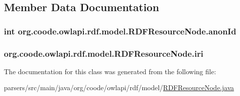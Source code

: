 \subsection{Member Data Documentation}
\hypertarget{classorg_1_1coode_1_1owlapi_1_1rdf_1_1model_1_1_r_d_f_resource_node_abaac8c51697586287ab04b15fec1da51}{
\subsubsection[{anon\-Id}]{\setlength{\rightskip}{0pt plus 5cm}int org.\-coode.\-owlapi.\-rdf.\-model.\-R\-D\-F\-Resource\-Node.\-anon\-Id\hspace{0.3cm}{\ttfamily [private]}}}\label{classorg_1_1coode_1_1owlapi_1_1rdf_1_1model_1_1_r_d_f_resource_node_abaac8c51697586287ab04b15fec1da51}
\hypertarget{classorg_1_1coode_1_1owlapi_1_1rdf_1_1model_1_1_r_d_f_resource_node_a7e6e57e11b925207f665f28cd06e2147}{
\subsubsection[{iri}]{ org.\-coode.\-owlapi.\-rdf.\-model.\-R\-D\-F\-Resource\-Node.\-iri\hspace{0.3cm}{\ttfamily [private]}}}\label{classorg_1_1coode_1_1owlapi_1_1rdf_1_1model_1_1_r_d_f_resource_node_a7e6e57e11b925207f665f28cd06e2147}


The documentation for this class was generated from the following file\-:\begin{DoxyCompactItemize}
\item 
parsers/src/main/java/org/coode/owlapi/rdf/model/\hyperlink{_r_d_f_resource_node_8java}{R\-D\-F\-Resource\-Node.\-java}\end{DoxyCompactItemize}
